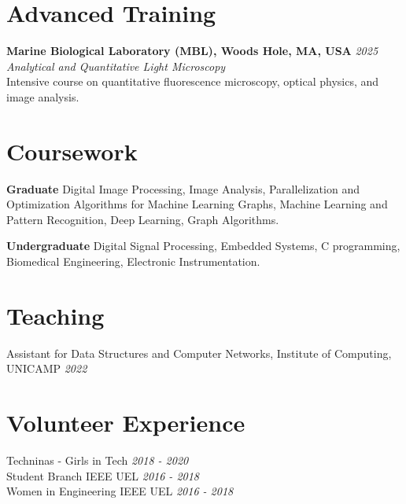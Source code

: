 \documentclass[margin,line]{resume}
\begin{document}
\begin{resume}
    \section{\mysidestyle Advanced Training}
    
    \textbf{Marine Biological Laboratory (MBL), Woods Hole, MA, USA} \hfill \textsl{2025}\\
    \textit{Analytical and Quantitative Light Microscopy}\\
    Intensive course on quantitative fluorescence microscopy, optical physics, and image analysis.
    \section{\mysidestyle Coursework}  
      \textbf{Graduate} Digital Image Processing, Image Analysis, Parallelization and Optimization Algorithms for Machine Learning Graphs, Machine Learning and Pattern Recognition,  Deep Learning, Graph Algorithms.
    \vspace{-0.3cm}

      \textbf{Undergraduate} Digital Signal Processing, Embedded Systems, C programming, Biomedical Engineering, Electronic Instrumentation.
     \vspace{-0.3cm}
     \section{\mysidestyle Teaching}
             Assistant for Data Structures and Computer Networks, Institute of Computing, UNICAMP \hfill \textsl{2022}
     \vspace{-0.3cm}
     \section{\mysidestyle Volunteer Experience}
        Techninas - Girls in Tech \hfill \textsl{2018 - 2020}\\
        Student Branch IEEE UEL \hfill \textsl{2016 - 2018}\\
        Women in Engineering IEEE UEL \hfill \textsl{2016 - 2018}
     \vspace{-0.3cm}

\end{resume}
\end{document}
